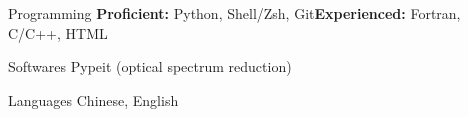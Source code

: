 


\begin{cvskills}


\cvskill
{Programming} %
{\textbf{Proficient:} Python, Shell/Zsh, Git\quad \textbf{Experienced:} Fortran, C/C++, HTML} %



\cvskill
{Softwares} %
{Pypeit (optical spectrum reduction)} %



\cvskill
{Languages} %
{Chinese, English} %

\end{cvskills}
